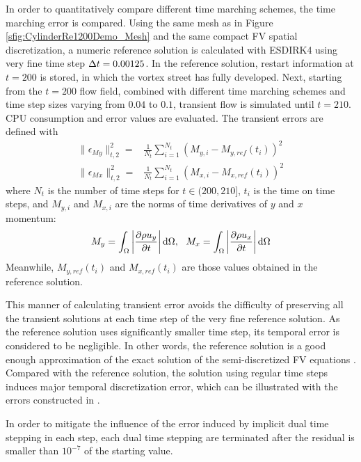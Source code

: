 In order to quantitatively compare different
time marching schemes,
the time marching error is compared.
Using the same mesh as in Figure \ref{sfig:CylinderRe1200Demo_Mesh}
and the same compact FV spatial  discretization,
a numeric reference solution is calculated with ESDIRK4 using
very fine time step ${\Delta} t = 0.00125$.
In the reference solution, restart information at $t=200$
is stored, in which the vortex street has fully developed.
Next, starting from the $t=200$ flow field, combined with
different time marching schemes and time step sizes
varying from $0.04$ to $0.1$, transient flow is simulated until $t=210$.
CPU consumption and error values are evaluated.
The transient errors are defined with
\begin{equation}
    \begin{aligned}
        \|\epsilon_{My}\|_{t,2}^2
        = & \frac{1}{N_{t}}\sum_{i=1}^{N_t}{(M_{y,i}-M_{y,ref}(t_i))^2} \\
        \|\epsilon_{Mx}\|_{t,2}^2
        = & \frac{1}{N_{t}}\sum_{i=1}^{N_t}{(M_{x,i}-M_{x,ref}(t_i))^2}
    \end{aligned}
    \label{eq:vorstreetErr}
\end{equation}
where $N_{t}$ is the number of time steps for $t\in(200,210]$,
$t_i$ is the time on time steps, and $M_{y,i}$ and $M_{x,i}$ are
the norms of time derivatives of $y$ and $x$ momentum:
\begin{equation}
    M_y = \int_{\Omega}{\left|\partialderivative{\rho u_y}{t}\right| \dd \Omega},\ \
    M_x = \int_{\Omega}{\left|\partialderivative{\rho u_x}{t}\right| \dd \Omega}
\end{equation}
Meanwhile, $M_{y,ref}(t_i)$ and $M_{x,ref}(t_i)$ are those values
obtained in the reference solution.

This manner of calculating transient error avoids the difficulty
of preserving all the transient solutions at each time step of
the very fine reference solution.
As the reference solution uses significantly smaller time step,
its temporal error is considered to be negligible.
In other words, the reference solution is a good enough
approximation of the exact solution of the semi-discretized
FV equations .
Compared with the reference
solution, the solution using regular time steps
induces major temporal discretization error, which can
be illustrated with the errors constructed in .

In order to mitigate the influence of the error induced
by implicit dual time stepping in each step,
each dual time stepping are terminated after
the residual is smaller than $10^{-7}$ of the
starting value.

